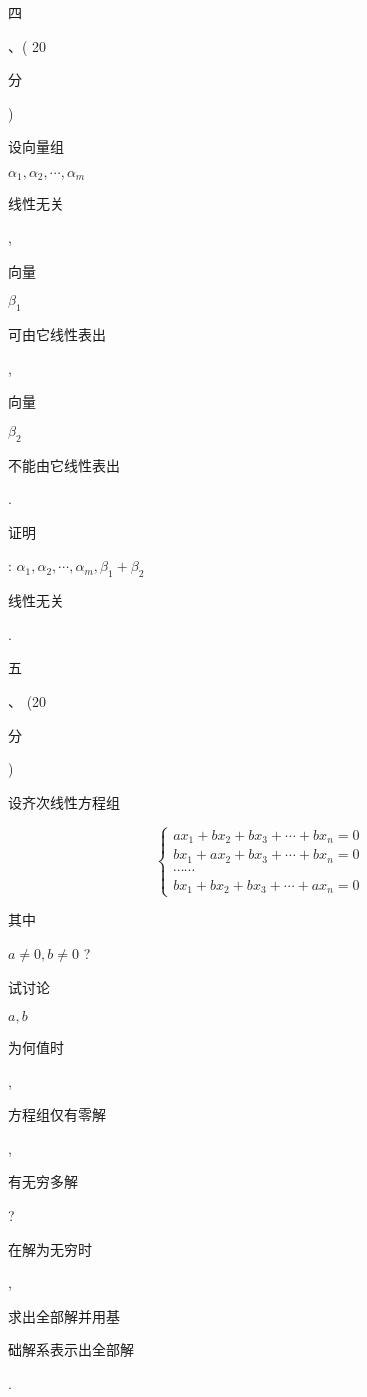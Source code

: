 \documentclass[10pt]{article}
\begin{document}
\begin{CJK}{UTF8}{mj}四\end{CJK}、( 20 \begin{CJK}{UTF8}{mj}分\end{CJK}) \begin{CJK}{UTF8}{mj}设向量组\end{CJK} $\alpha_{1}, \alpha_{2}, \cdots, \alpha_{m}$ \begin{CJK}{UTF8}{mj}线性无关\end{CJK}, \begin{CJK}{UTF8}{mj}向量\end{CJK} $\beta_{1}$ \begin{CJK}{UTF8}{mj}可由它线性表出\end{CJK}, \begin{CJK}{UTF8}{mj}向量\end{CJK} $\beta_{2}$ \begin{CJK}{UTF8}{mj}不能由它线性表出\end{CJK}. \begin{CJK}{UTF8}{mj}证明\end{CJK}: $\alpha_{1}, \alpha_{2}, \cdots, \alpha_{m}, \beta_{1}+\beta_{2}$ \begin{CJK}{UTF8}{mj}线性无关\end{CJK}.

\begin{CJK}{UTF8}{mj}五\end{CJK}、 (20 \begin{CJK}{UTF8}{mj}分\end{CJK}) \begin{CJK}{UTF8}{mj}设齐次线性方程组\end{CJK}
$$
\left\{\begin{array}{l}
a x_{1}+b x_{2}+b x_{3}+\cdots+b x_{n}=0 \\
b x_{1}+a x_{2}+b x_{3}+\cdots+b x_{n}=0 \\
\cdots \cdots \\
b x_{1}+b x_{2}+b x_{3}+\cdots+a x_{n}=0
\end{array}\right.
$$
\begin{CJK}{UTF8}{mj}其中\end{CJK} $a \neq 0, b \neq 0$ ? \begin{CJK}{UTF8}{mj}试讨论\end{CJK} $a, b$ \begin{CJK}{UTF8}{mj}为何值时\end{CJK}, \begin{CJK}{UTF8}{mj}方程组仅有零解\end{CJK}, \begin{CJK}{UTF8}{mj}有无穷多解\end{CJK}? \begin{CJK}{UTF8}{mj}在解为无穷时\end{CJK}, \begin{CJK}{UTF8}{mj}求出全部解并用基\end{CJK} \begin{CJK}{UTF8}{mj}础解系表示出全部解\end{CJK}.
\end{document}
